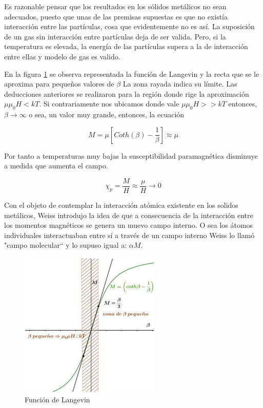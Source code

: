Es razonable pensar que los resultados en los sólidos metálicos no sean adecuados, puesto que unas de las premisas supuestas es que no existía interacción entre las partículas, cosa que evidentemente no es así. La suposición de un gas sin interacción entre partículas deja de ser valida. Pero, si la temperatura es elevada, la energía de las partículas supera a la de interacción entre ellas y modelo de gas es valido.

En la figura \ref{fig:c2} se observa representada la función de Langevin y la recta que se le aproxima para pequeños valores de $\beta$ La zona rayada indica su límite. Las deducciones anteriores se realizaron para la región donde rige la aproximación $\mu\mu_{0}H < kT$. Si contrariamente nos ubicamos donde vale $\mu\mu_{0}H >> kT$ entonces, $\beta\rightarrow\infty$ o sea, un valor muy grande, entonces, la ecuación

\begin{equation*}
	M= \mu \left[ Coth(\beta)-\dfrac{1}{\beta} \right] \approx \mu
\end{equation*}

Por tanto a temperaturas muy bajas la susceptibilidad paramagnética disminuye a medida que aumenta el campo. 

\begin{equation}
	\chi_{p} = \dfrac{M}{H} \approx \dfrac{\mu}{H}\rightarrow 0
\end{equation}


Con el objeto de contemplar la interacción atómica existente en los solidos metálicos, Weiss introdujo la idea de que a consecuencia de la interacción entre los momentos magnéticos se genera un muevo campo interno. O sea los átomos individuales interactuaban entre sí a través de un campo interno Weiss lo llamó "campo molecular“ y lo supuso igual a: $\alpha M$.


\begin{figure}[H]
    \centering
    \includegraphics[width=0.6\textwidth]{./Figures/fig_c2}
	\caption{Función de Langevin}
	\label{fig:c2}
\end{figure}

